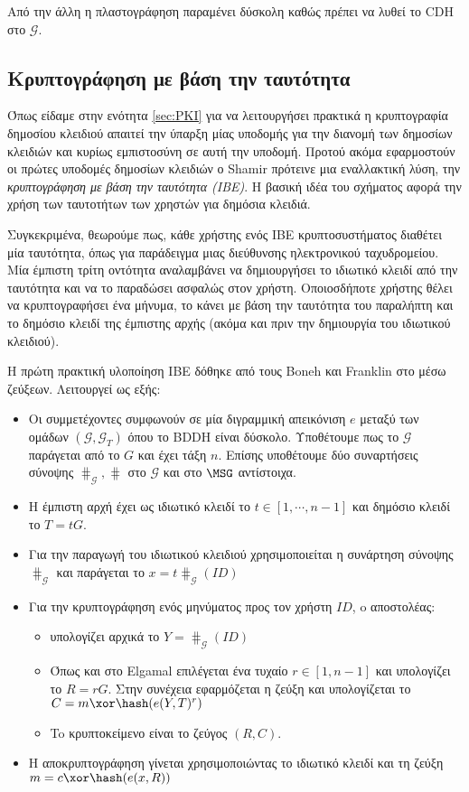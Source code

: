 Από την άλλη η πλαστογράφηση παραμένει δύσκολη καθώς πρέπει να  λυθεί το \gls{CDH} στο $\mathcal G$.

\subsection{Κρυπτογράφηση με βάση την ταυτότητα}
\label{sec:IBE}
Όπως είδαμε στην ενότητα \ref{sec:PKI} για να λειτουργήσει πρακτικά η κρυπτογραφία δημοσίου κλειδιού απαιτεί την ύπαρξη μίας υποδομής για την διανομή των δημοσίων κλειδιών και κυρίως εμπιστοσύνη σε αυτή την υποδομή.  Προτού ακόμα εφαρμοστούν οι πρώτες υποδομές δημοσίων κλειδιών ο Shamir \cite{ShamirIBE84} πρότεινε μια εναλλακτική λύση, την \emph{κρυπτογράφηση με βάση την ταυτότητα (\gls{IBE})}. Η βασική ιδέα του σχήματος αφορά την χρήση των ταυτοτήτων των χρηστών για δημόσια κλειδιά.

Συγκεκριμένα, θεωρούμε πως, κάθε χρήστης ενός \gls{IBE} κρυπτοσυστήματος διαθέτει μία ταυτότητα, όπως για παράδειγμα μιας διεύθυνσης ηλεκτρονικού ταχυδρομείου. Μία έμπιστη τρίτη οντότητα αναλαμβάνει να δημιουργήσει το ιδιωτικό κλειδί από την ταυτότητα και να το παραδώσει ασφαλώς στον χρήστη. Οποιοσδήποτε χρήστης θέλει να κρυπτογραφήσει ένα μήνυμα, το κάνει με βάση την ταυτότητα του παραλήπτη και το δημόσιο κλειδί της έμπιστης αρχής (ακόμα και πριν την δημιουργία του  ιδιωτικού κλειδιού).

Η πρώτη πρακτική υλοποίηση \gls{IBE} δόθηκε από τους Boneh και Franklin στο \cite{BonehIBE01} μέσω ζεύξεων. Λειτουργεί ως εξής:
\begin{itemize}
\item Οι συμμετέχοντες συμφωνούν σε μία διγραμμική απεικόνιση $e$ μεταξύ των ομάδων $(\mathcal G,\mathcal G_T)$ όπου το \gls{BDDH} είναι δύσκολο. Υποθέτουμε πως το $\mathcal G$ παράγεται από το $G$ και έχει τάξη $n$. Επίσης υποθέτουμε δύο συναρτήσεις σύνοψης $\hash_{\mathcal G}, \hash$ στο $\mathcal G$ και στο $\MSG$ αντίστοιχα.
\item Η έμπιστη αρχή έχει ως ιδιωτικό κλειδί το $t \in [1,\cdots, n-1]$ και δημόσιο κλειδί το $T=tG$.
\item Για την παραγωγή του ιδιωτικού κλειδιού χρησιμοποιείται η συνάρτηση σύνοψης $\hash_{\mathcal G}$ και παράγεται το $x = t \hash_{\mathcal G}(ID)$
\item Για την κρυπτογράφηση ενός μηνύματος προς τον χρήστη $ID$, o αποστολέας:
\begin{itemize}
\item υπολογίζει αρχικά το $Y=\hash_{\mathcal G}(ID)$
\item Όπως και στο Elgamal επιλέγεται ένα τυχαίο $r \in [1,n-1]$ και υπολογίζει το $R=rG$. Στην συνέχεια εφαρμόζεται η ζεύξη και υπολογίζεται το $C = m \xor \hash(e(Y,T)^r)$ 
\item To κρυπτοκείμενο είναι το ζεύγος $(R,C)$.
\end{itemize}
\item H αποκρυπτογράφηση γίνεται χρησιμοποιώντας το ιδιωτικό κλειδί και τη ζεύξη $m=c \xor \hash(e(x,R))$
\end{itemize}

